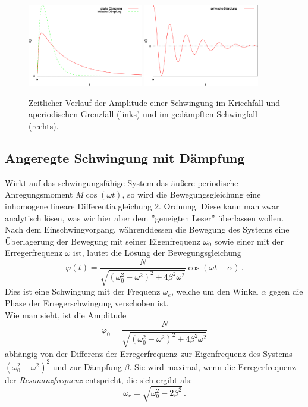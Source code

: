 \begin{figure}[ht!]
\begin{center}
\includegraphics[width=0.45\textwidth]{Versuch_neu_1-2/figures/2285.pdf}
\includegraphics[width=0.45\textwidth]{Versuch_neu_1-2/figures/2284.pdf}
\end{center}
\caption{Zeitlicher Verlauf der Amplitude einer Schwingung im Kriechfall und aperiodischen Grenzfall (links) und im gedämpften Schwingfall (rechts).}
\label{fig:Schwingungen}
\end{figure}

\subsection{Angeregte Schwingung mit Dämpfung}

Wirkt auf das schwingungsfähige System das äußere periodische Anregungsmoment $M\cos(\omega t)$, so wird die Bewegungsgleichung eine inhomogene lineare Differentialgleichung 2. Ordnung. Diese kann man zwar analytisch lösen, was wir hier aber dem ''geneigten Leser'' überlassen wollen.\\
Nach dem Einschwingvorgang, währenddessen die Bewegung des Systems eine Überlagerung der Bewegung mit seiner Eigenfrequenz $\omega_0$ sowie einer mit der Erregerfrequenz $\omega$ ist, lautet die Lösung der Bewegungsgleichung 
\begin{equation}
	\varphi(t) = \frac{N}{\sqrt{\left(\omega_0^2 - \omega^2\right)^2 +4\beta^2\omega^2}}\cos(\omega t - \alpha)\, .
\end{equation}
Dies ist eine Schwingung mit der Frequenz $\omega_e$, welche um den Winkel $\alpha$ gegen die Phase der Erregerschwingung verschoben ist. \\
Wie man sieht, ist die Amplitude 
\begin{equation*}
	\varphi_0 = \frac{N}{\sqrt{\left(\omega_0^2 - \omega^2\right)^2 +4\beta^2\omega^2}}
\end{equation*}
abhängig von der Differenz der Erregerfrequenz zur Eigenfrequenz des Systems $\left(\omega_0^2 - \omega^2\right)^2$ und zur Dämpfung $\beta$. Sie wird maximal, wenn die Erregerfrequenz der \textit{Resonanzfrequenz} entspricht, die sich ergibt als:
\begin{equation}
	\omega_r = \sqrt{\omega_0^2 -2\beta^2}\, .
\end{equation}

